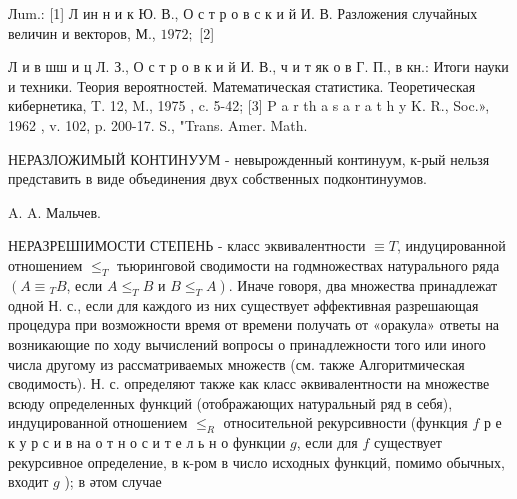 \documentclass[10pt]{article}
\begin{document}
Лum.: [1] Л ин н и к Ю. В., О с т р о в с к и й И. В. Разложения случайных величин и векторов, М., $1972 ;$ [2]

Л и в шш и ц Л. З., О с т р о в к и й И. В., ч и т як о в Г. П., в кн.: Итоги науки и техники. Теория вероятностей. Математическая статистика. Теоретическая кибернетика, T. 12, M., 1975 , c. 5-42; [3] P a r th a s a r a t h y K. R., Soc.», 1962 , v. 102, p. 200-17. S., "Trans. Amer. Math.



НЕРАЗЛОЖИМЫЙ КОНТИНУУМ - невырожденный континуум, к-рый нельзя представить в виде объединения двух собственных подконтинуумов.



A. A. Мальчев.



НЕРАЗРЕШІИМОСТИ СТЕПЕНЬ - класс эквивалентности $\equiv T$, индуцированной отношением $\leqslant_{T}$ тьюринговой сводимости на годмножествах натурального ряда $\left(A \equiv{ }_{T} B\right.$, если $A \leqslant_{T} B$ и $\left.B \leqslant_{T} A\right)$. Иначе говоря, два множества принадлежат одной Н. с., если для каждого из них существует әффективная разрешающая процедура при возможности время от времени получать от «оракула» ответы на возникающие по ходу вычислений вопросы о принадлежности того или иного числа другому из рассматриваемых множеств (см. также Алгоритмическая сводимость). Н. с. определяют также как класс әквивалентности на множестве всюду определенных функций (отображающих натуральный ряд в себя), индуцированной отношением $\leqslant_{R}$ относительной рекурсивности (функция $f$ р е к у р с и в на о т н о с и т е л ь н о функции $g$, если для $f$ существует рекурсивное определение, в к-ром в число исходных функций, помимо обычных, входит $g$ ); в әтом случае
\end{document}
